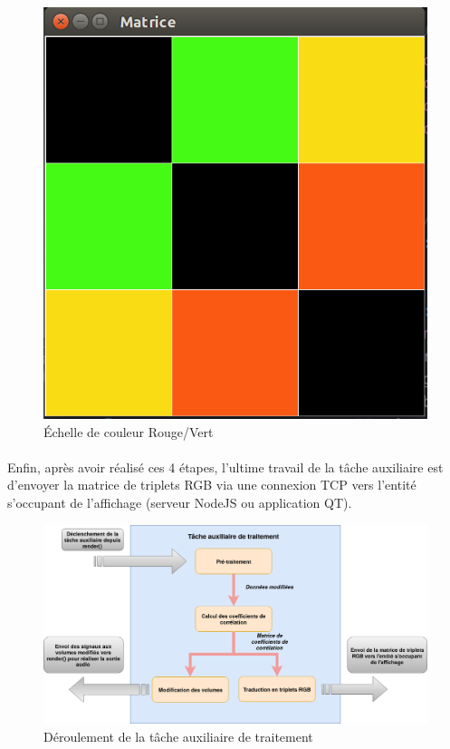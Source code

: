 \begin{figure}[H]
    \centering
    \includegraphics[scale=0.3]{assets/captureRGB.png}
    \caption{Échelle de couleur Rouge/Vert}
    \label{bw scale}
\end{figure}
\paragraph{}
Enfin, après avoir réalisé ces 4 étapes, l'ultime travail de la tâche auxiliaire est d'envoyer la matrice de triplets RGB via une connexion TCP vers l'entité s'occupant de l'affichage (serveur NodeJS ou application QT).
\begin{figure}[H]
    \centering
    \includegraphics[scale=0.45]{assets/auxtask.png}
    \caption{Déroulement de la tâche auxiliaire de traitement}
    \label{aux task}
\end{figure}

